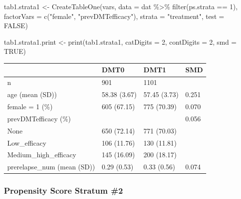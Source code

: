\documentclass[
  letterpaper,
  DIV=11,
  numbers=noendperiod]{scrreprt}
\newenvironment{Shaded}{\begin{snugshade}}{\end{snugshade}}
\newcommand{\AttributeTok}[1]{\textcolor[rgb]{0.40,0.45,0.13}{#1}}
\newcommand{\ConstantTok}[1]{\textcolor[rgb]{0.56,0.35,0.01}{#1}}
\newcommand{\DecValTok}[1]{\textcolor[rgb]{0.68,0.00,0.00}{#1}}
\newcommand{\FunctionTok}[1]{\textcolor[rgb]{0.28,0.35,0.67}{#1}}
\newcommand{\NormalTok}[1]{\textcolor[rgb]{0.00,0.23,0.31}{#1}}
\newcommand{\OtherTok}[1]{\textcolor[rgb]{0.00,0.23,0.31}{#1}}
\newcommand{\SpecialCharTok}[1]{\textcolor[rgb]{0.37,0.37,0.37}{#1}}
\newcommand{\StringTok}[1]{\textcolor[rgb]{0.13,0.47,0.30}{#1}}
\begin{document}
\begin{Shaded}
\begin{Highlighting}[]
\NormalTok{tab1.strata1 }\OtherTok{\textless{}{-}} \FunctionTok{CreateTableOne}\NormalTok{(vars, }\AttributeTok{data =}\NormalTok{ dat }\SpecialCharTok{\%\textgreater{}\%} \FunctionTok{filter}\NormalTok{(ps.strata }\SpecialCharTok{==} \DecValTok{1}\NormalTok{), }
                               \AttributeTok{factorVars =} \FunctionTok{c}\NormalTok{(}\StringTok{"female"}\NormalTok{, }\StringTok{"prevDMTefficacy"}\NormalTok{), }
                               \AttributeTok{strata =} \StringTok{"treatment"}\NormalTok{, }\AttributeTok{test =} \ConstantTok{FALSE}\NormalTok{)}

\NormalTok{tab1.strata1.print }\OtherTok{\textless{}{-}} \FunctionTok{print}\NormalTok{(tab1.strata1, }\AttributeTok{catDigits =} \DecValTok{2}\NormalTok{, }\AttributeTok{contDigits =} \DecValTok{2}\NormalTok{, }
                            \AttributeTok{smd =} \ConstantTok{TRUE}\NormalTok{)}
\end{Highlighting}
\end{Shaded}

\begin{longtable}[]{@{}llll@{}}
\toprule\noalign{}
& DMT0 & DMT1 & SMD \\
\midrule\noalign{}
\endhead
\bottomrule\noalign{}
\endlastfoot
n & 901 & 1101 & \\
age (mean (SD)) & 58.38 (3.67) & 57.45 (3.73) & 0.251 \\
female = 1 (\%) & 605 (67.15) & 775 (70.39) & 0.070 \\
prevDMTefficacy (\%) & & & 0.056 \\
None & 650 (72.14) & 771 (70.03) & \\
Low\_efficacy & 106 (11.76) & 130 (11.81) & \\
Medium\_high\_efficacy & 145 (16.09) & 200 (18.17) & \\
prerelapse\_num (mean (SD)) & 0.29 (0.53) & 0.33 (0.56) & 0.074 \\
\end{longtable}

\hypertarget{propensity-score-stratum-2}{%
\subsubsection{Propensity Score Stratum
\#2}\label{propensity-score-stratum-2}}
\end{document}
